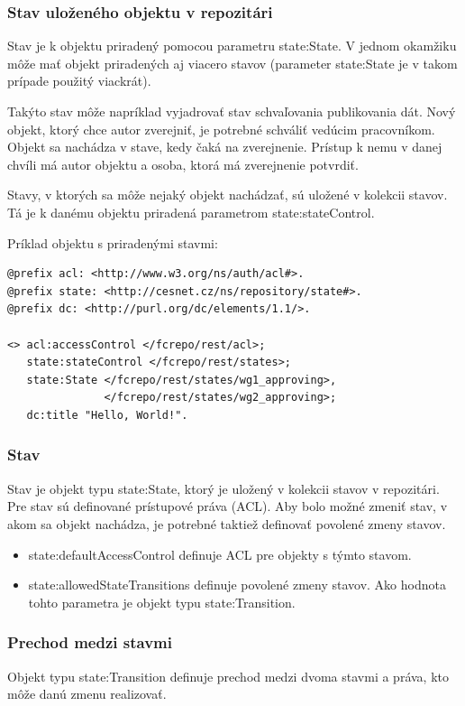 \documentclass[thesis=M,slovak]{FITthesis}[2013/05/06]
\begin{document}
\subsubsection{Stav uloženého objektu v repozitári}
Stav je k objektu priradený pomocou parametru state:State. V jednom okamžiku môže mať objekt priradených aj viacero stavov (parameter state:State je v takom prípade použitý viackrát).

Takýto stav môže napríklad vyjadrovať stav schvaľovania publikovania dát. Nový objekt, ktorý chce autor zverejniť, je potrebné schváliť vedúcim pracovníkom. Objekt sa nachádza v stave, kedy čaká na zverejnenie. Prístup k nemu v danej chvíli má autor objektu a osoba, ktorá má zverejnenie potvrdiť.

Stavy, v ktorých sa môže nejaký objekt nachádzať, sú uložené v kolekcii stavov. Tá je k danému objektu priradená parametrom state:stateControl.

Príklad objektu s priradenými stavmi:
\begin{lstlisting}[frame=single] 
@prefix acl: <http://www.w3.org/ns/auth/acl#>.
@prefix state: <http://cesnet.cz/ns/repository/state#>.
@prefix dc: <http://purl.org/dc/elements/1.1/>.

<> acl:accessControl </fcrepo/rest/acl>;
   state:stateControl </fcrepo/rest/states>;
   state:State </fcrepo/rest/states/wg1_approving>,
               </fcrepo/rest/states/wg2_approving>;
   dc:title "Hello, World!".
\end{lstlisting}

\subsubsection{Stav}
Stav je objekt typu state:State, ktorý je uložený v kolekcii stavov v repozitári. Pre stav sú definované prístupové práva (ACL). Aby bolo možné zmeniť stav, v akom sa objekt nachádza, je potrebné taktiež definovať povolené zmeny stavov.

\begin{itemize}
	\item state:defaultAccessControl definuje ACL pre objekty s týmto stavom.
	\item state:allowedStateTransitions definuje povolené zmeny stavov. Ako hodnota tohto parametra je objekt typu state:Transition.
\end{itemize}

\subsubsection{Prechod medzi stavmi}
Objekt typu state:Transition definuje prechod medzi dvoma stavmi a práva, kto môže danú zmenu realizovať.
\end{document}
